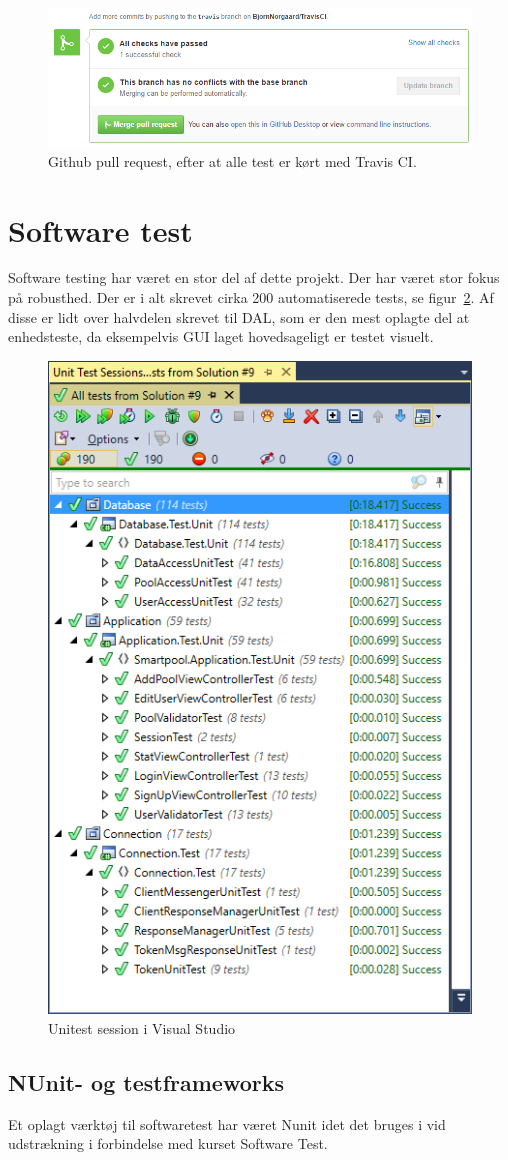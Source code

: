 \begin{figure}[h]
	\centering
	\includegraphics[width=0.9\linewidth]{figs/processProjektGennemforsel/travis/travisgithubsuccess}
	\caption{Github pull request, efter at alle test er kørt med Travis CI.}
	\label{fig:travisgithubsuccess}
\end{figure}

\section{Software test}
Software testing har været en stor del af dette projekt. Der har været stor fokus på robusthed. Der er i alt skrevet cirka 200 automatiserede tests, se figur~\ref{fig:vsUnittest}. Af disse er lidt over halvdelen skrevet til DAL, som er den mest oplagte del at enhedsteste, da eksempelvis GUI laget hovedsageligt er testet visuelt.

\begin{figure}[h]
	\centering
	\includegraphics[width=0.5\linewidth]{figs/processProjektGennemforsel/vsUnittest}
	\caption{Unitest session i Visual Studio}
	\label{fig:vsUnittest}
\end{figure}

\subsection{NUnit- og testframeworks}
Et oplagt værktøj til softwaretest har været Nunit idet det bruges i vid udstrækning i forbindelse med kurset Software Test.